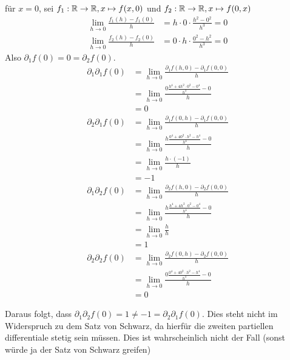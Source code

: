 \documentclass[sectionformat=aufgabe]{gadsescript}
\begin{document}
für $ x = 0 $, sei $ f_1: \mathbb{R} \to \mathbb{R}, x \mapsto  f(x, 0) $ und $ f_2: \mathbb{R} \to \mathbb{R} , x \mapsto f(0, x) $
\begin{align*}
	\lim_{h \to 0} \frac{ f_1(h) - f_1(0) }{ h } &= h \cdot 0 \cdot \frac{h^2 - 0^2}{ h^3 } = 0
\end{align*}
\begin{align*}
	\lim_{h \to 0} \frac{ f_2(h) - f_2(0) }{ h } &= 0 \cdot h \cdot \frac{0^2 - h^2}{ h^3 } = 0
\end{align*}
Also $ \partial_1 f(0) = 0 = \partial_2 f(0) $.
\begin{align*}
	\partial_1 \partial_1 f(0) &= \lim_{h \to 0} \frac{ \partial_1 f(h, 0) - \partial_1 f(0, 0) }{ h } \\
	~ &= \lim_{h \to 0} \frac{ 0 \frac{ h^4 +4h^2 \cdot 0^2 - 0^4 }{ h^4 } - 0 }{ h }\\
	~ &= 0
\end{align*}
\begin{align*}
	\partial_2 \partial_1 f(0) &= \lim_{h \to 0} \frac{ \partial_1 f(0, h) - \partial_1 f(0, 0) }{ h } \\
	~ &= \lim_{h \to 0} \frac{ h \frac{ 0^4 +40^2 \cdot h^2 - h^4 }{ h^4 } - 0 }{ h }\\
	~ &= \lim_{h \to 0} \frac{ h \cdot (-1) }{ h } \\
	~ &= -1
\end{align*}
\begin{align*}
	\partial_1 \partial_2 f(0) &= \lim_{h \to 0} \frac{ \partial_2 f(h, 0) - \partial_2 f(0, 0) }{ h } \\
	~ &= \lim_{h \to 0} \frac{ h \frac{ h^4 +4h^2 \cdot 0^2 - 0^4 }{ h^4 } - 0 }{ h }\\
	~ &= \lim_{h \to 0} \frac{ h }{ h } \\
	~ &= 1
\end{align*}
\begin{align*}
	\partial_2 \partial_2 f(0) &= \lim_{h \to 0} \frac{ \partial_2 f(0, h) - \partial_2 f(0, 0) }{ h } \\
	~ &= \lim_{h \to 0} \frac{ 0 \frac{ 0^4 +40^2 \cdot h^2 - h^4 }{ h^4 } - 0 }{ h }\\
	~ &= 0
\end{align*}

Daraus folgt, dass $ \partial_1\partial_2 f(0) = 1 \neq -1 = \partial_2\partial_1 f(0) $.
Dies steht nicht im Widerspruch zu dem Satz von Schwarz, da hierfür die zweiten partiellen differentiale stetig sein müssen.
Dies ist wahrscheinlich nicht der Fall (sonst würde ja der Satz von Schwarz greifen)
\end{document}
